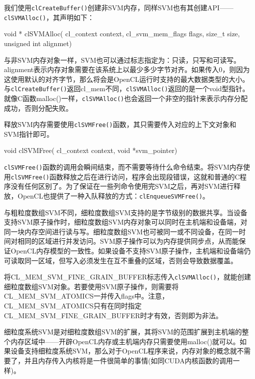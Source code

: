我们使用\texttt{clCreateBuffer()}创建非SVM内存，同样SVM也有其创建API——\texttt{clSVMAlloc()}，其声明如下：

\begin{codebox}[cpp]
void *
clSVMAlloc(
  cl_context context,
  cl_svm_mem_flags flags,
  size_t size,
  unsigned int alignmet)
\end{codebox}

与非SVM内存对象一样，SVM也可以通过标志指定为：只读，只写和可读写。alignment表示内存对象需要在该系统上以最少多少字节对齐。如果传入0，则因为这使用默认的对齐字节，那么将会是OpenCL运行时支持的最大数据类型的大小。与\texttt{clCreateBuffer()}返回cl\_\allowbreak{}mem不同，\texttt{clSVMAlloc()}返回的是一个void型指针。就像C函数malloc()一样，\texttt{clSVMAlloc()}也会返回一个非空的指针来表示内存分配成功，否则分配失败。

释放SVM内存需要使用\texttt{clSVMFree()}函数，其只需要传入对应的上下文对象和SVM指针即可。

\begin{codebox}[cpp]
void
clSVMFree(
  cl_context context,
  void *svm_pointer)
\end{codebox}

\texttt{clSVMFree()}函数的调用会瞬间结束，而不需要等待什么命令结束。将SVM内存使用\texttt{clSVMFree()}函数释放之后在进行访问，程序会出现段错误，这就和普通的C程序没有任何区别了。为了保证在一些列命令使用完SVM之后，再对SVM进行释放，OpenCL也提供了一种入队释放的方式：\texttt{clEnqueueSVMFree()}。

与粗粒度数组SVM不同，细粒度数组SVM支持的是字节级别的数据共享。当设备支持SVM原子操作时，细粒度数组SVM内存对象可以同时在主机端和设备端，对同一块内存空间进行读与写。细粒度数组SVM也可被同一或不同设备，在同一时间对相同的区域进行并发访问。SVM原子操作可以为内存提供同步点，从而能保证OpenCL内存模型的一致性。如果设备不支持SVM原子操作，主机端和设备端仍可读取同一区域，但写入必须发生在互不重叠的区域，否则会导致数据覆盖。

将CL\_\allowbreak{}MEM\_\allowbreak{}SVM\_\allowbreak{}FINE\_\allowbreak{}GRAIN\_\allowbreak{}BUFFER标志传入\texttt{clSVMAlloc()}，就能创建细粒度数组SVM对象。若要使用SVM原子操作，则需要将CL\_\allowbreak{}MEM\_\allowbreak{}SVM\_\allowbreak{}ATOMICS一并传入flags中。注意，CL\_\allowbreak{}MEM\_\allowbreak{}SVM\_\allowbreak{}ATOMICS只有在同时指定CL\_\allowbreak{}MEM\_\allowbreak{}SVM\_\allowbreak{}FINE\_\allowbreak{}GRAIN\_\allowbreak{}BUFFER时才有效，否则即为非法。

细粒度系统SVM是对细粒度数组SVM的扩展，其将SVM的范围扩展到主机端的整个内存区域中——开辟OpenCL内存或主机端内存只需要使用malloc()就可以。如果设备支持细粒度系统SVM，那么对于OpenCL程序来说，内存对象的概念就不需要了，并且内存传入内核将是一件很简单的事情(如同CUDA内核函数的调用一样)。

